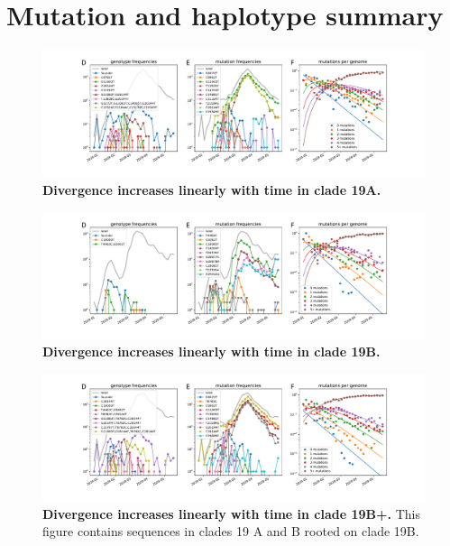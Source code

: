 \section*{Mutation and haplotype summary}

\begin{figure}
    \includegraphics[width=\textwidth]{figures/counts/19A_counts.pdf}
    \caption{{\bf Divergence increases linearly with time in clade 19A.}
    \label{fig:19A_counts}}
\end{figure}

\begin{figure}
    \includegraphics[width=\textwidth]{figures/counts/19B_counts.pdf}
    \caption{{\bf Divergence increases linearly with time in clade 19B.}
    \label{fig:19B_counts}}
\end{figure}

\begin{figure}
    \includegraphics[width=\textwidth]{figures/counts/19B+_counts.pdf}
    \caption{{\bf Divergence increases linearly with time in clade 19B+.}
    This figure contains sequences in clades 19 A and B rooted on clade 19B.
    \label{fig:19B+_counts}}
\end{figure}

